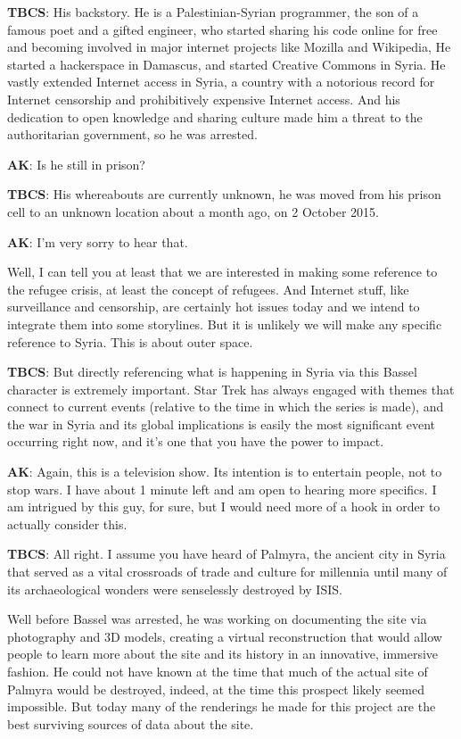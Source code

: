 \textbf{TBCS}: His backstory. He is a Palestinian-Syrian programmer, the
son of a famous poet and a gifted engineer, who started sharing his code
online for free and becoming involved in major internet projects like
Mozilla and Wikipedia, He started a hackerspace in Damascus, and started
Creative Commons in Syria. He vastly extended Internet access in Syria,
a country with a notorious record for Internet censorship and
prohibitively expensive Internet access. And his dedication to open
knowledge and sharing culture made him a threat to the authoritarian
government, so he was arrested.

\textbf{AK}: Is he still in prison?

\textbf{TBCS}: His whereabouts are currently unknown, he was moved from
his prison cell to an unknown location about a month ago, on 2 October
2015.

\textbf{AK}: I'm very sorry to hear that.

Well, I can tell you at least that we are interested in making some
reference to the refugee crisis, at least the concept of refugees. And
Internet stuff, like surveillance and censorship, are certainly hot
issues today and we intend to integrate them into some storylines. But
it is unlikely we will make any specific reference to Syria. This is
about outer space.

\textbf{TBCS}: But directly referencing what is happening in Syria via
this Bassel character is extremely important. Star Trek has always
engaged with themes that connect to current events (relative to the time
in which the series is made), and the war in Syria and its global
implications is easily the most significant event occurring right now,
and it's one that you have the power to impact.

\textbf{AK}: Again, this is a television show. Its intention is to
entertain people, not to stop wars. I have about 1 minute left and am
open to hearing more specifics. I am intrigued by this guy, for sure,
but I would need more of a hook in order to actually consider this.

\textbf{TBCS}: All right. I assume you have heard of Palmyra, the
ancient city in Syria that served as a vital crossroads of trade and
culture for millennia until many of its archaeological wonders were
senselessly destroyed by ISIS.

Well before Bassel was arrested, he was working on documenting the site
via photography and 3D models, creating a virtual reconstruction that
would allow people to learn more about the site and its history in an
innovative, immersive fashion. He could not have known at the time that
much of the actual site of Palmyra would be destroyed, indeed, at the
time this prospect likely seemed impossible. But today many of the
renderings he made for this project are the best surviving sources of
data about the site.

